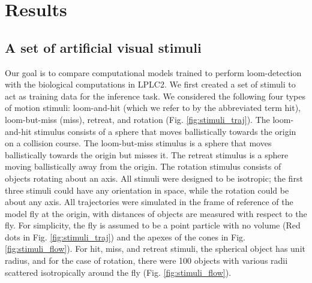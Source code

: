 \documentclass[pdftex,9pt,lineno]{elife}
\begin{document}
\section{Results}

\subsection{A set of artificial visual stimuli}





Our goal is to compare computational models trained to perform loom-detection with the biological computations in LPLC2. We first created a set of stimuli to act as training data for the inference task. We considered the following four types of motion stimuli: loom-and-hit (which we refer to by the abbreviated term hit), loom-but-miss (miss), retreat, and rotation (Fig. \ref{fig:stimuli_traj}). The loom-and-hit stimulus consists of a sphere that moves ballistically towards the origin on a collision course. The loom-but-miss stimulus is a sphere that moves ballistically towards the origin but misses it. The retreat stimulus is a sphere moving ballistically away from the origin. The rotation stimulus consists of objects rotating about an axis. All stimuli were designed to be isotropic; the first three stimuli could have any orientation in space, while the rotation could be about any axis. All trajectories were simulated in the frame of reference of the model fly  at the origin, with distances of objects are measured with respect to the fly. For simplicity, the fly is assumed to be a point particle with no volume (Red dots in Fig. \ref{fig:stimuli_traj}) and the apexes of the cones in Fig. \ref{fig:stimuli_flow}). For hit, miss, and retreat stimuli, the spherical object has unit radius, and for the case of rotation, there were 100 objects with various radii scattered isotropically around the fly (Fig. \ref{fig:stimuli_flow}).

\end{document}

